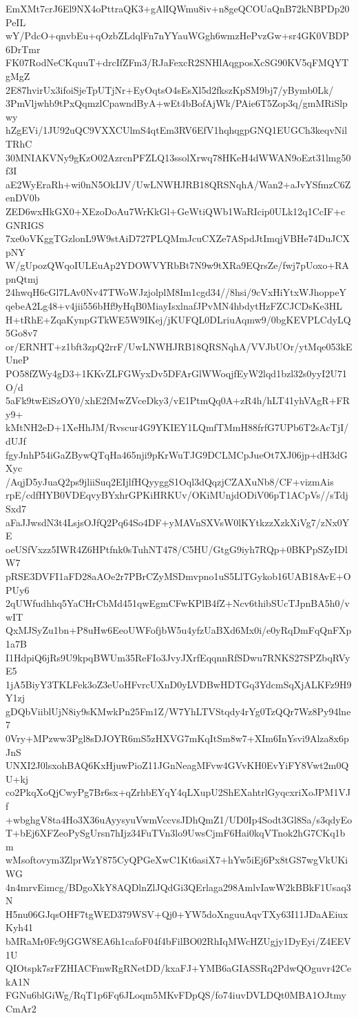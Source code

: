 EmXMt7crJ6El9NX4oPttraQK3+gAlIQWmu8iv+n8geQCOUaQnB72kNBPDp20PeIL
wY/PdcO+qnvbEu+qOzbZLdqlFn7nYYauWGgh6wmzHePvzGw+sr4GK0VBDP6DrTmr
FK07RodNeCKquuT+drcIfZFm3/RJaFexcR2SNHlAqgposXcSG90KV5qFMQYTgMgZ
2E87hvirUx3ifoiSjeTpUTjNr+EyOqtsO4sEsXl5d2fkszKpSM9bj7/yBymb0Lk/
3PmVljwhb9tPxQqmzlCpawndByA+wEt4bBofAjWk/PAie6T5Zop3q/gmMRiSlpwy
hZgEVi/1JU92uQC9VXXCUlmS4qtEm3RV6EfV1hqhqgpGNQ1EUGCh3keqvNilTRhC
30MNIAKVNy9gKzO02AzrcnPFZLQ13ssolXrwq78HKeH4dWWAN9oEzt31lmg50f3I
aE2WyEraRh+wi0nN5OkIJV/UwLNWHJRB18QRSNqhA/Wan2+aJvYSfmzC6ZenDV0b
ZED6wxHkGX0+XEzoDoAu7WrKkGl+GeWtiQWb1WaRIcip0ULk12q1CcIF+cGNRIGS
7xe0oVKggTGzlonL9W9stAiD727PLQMmJcuCXZe7ASpdJtImqjVBHe74DuJCXpNY
W/gUpozQWqoIULEuAp2YDOWVYRbBt7N9w9tXRa9EQrsZe/fwj7pUoxo+RApnQtmj
24hwqH6cGl7LAv0Nv47TWoWJzjolplM8Im1cgd34//8hsi/9cVxHiYtxWJhoppeY
qebeA2Lg48+v4jii556bHf9yHqB0MiayIsxlnafJPvMN4hbdytHzFZCJCDsKe3HL
H+tRhE+ZqaKynpGTkWE5W9IKej/jKUFQL0DLriuAqmw9/0bgKEVPLCdyLQ5Go8v7
or/ERNHT+z1bft3zpQ2rrF/UwLNWHJRB18QRSNqhA/VVJbUOr/ytMqe053kEUneP
PO58fZWy4gD3+1KKvZLFGWyxDv5DFArGlWWoqjfEyW2lqd1bzl32s0yyI2U71O/d
5aFk9twEiSzOY0/xhE2fMwZVceDky3/vE1PtmQq0A+zR4h/hLT41yhVAgR+FRy9+
kMtNH2eD+1XeHhJM/Rvscur4G9YKIEY1LQmfTMmH88frfG7UPb6T2sAcTjI/dUJf
fgyJnhP54iGaZBywQTqHa465nji9pKrWuTJG9DCLMCpJueOt7XJ06jp+dH3dGXyc
/AqjD5yJuaQ2ps9jliiSuq2EIjlfHQyyggS1Oql3dQqzjCZAXuNb8/CF+vizmAis
rpE/cdfHYB0VDEqvyBYxhrGPKiHRKUv/OKiMUnjdODiV06pT1ACpVs//sTdjSxd7
aFaJJwsdN3t4LsjsOJfQ2Pq64So4DF+yMAVnSXVsW0lKYtkzzXzkXiVg7/zNx0YE
oeUSfVxzz5IWR4Z6HPtfnk0sTuhNT478/C5HU/GtgG9iyh7RQp+0BKPpSZyIDlW7
pRSE3DVFI1aFD28aAOe2r7PBrCZyMSDmvpno1uS5LlTGykob16UAB18AvE+OPUy6
2qUWfudhhq5YaCHrCbMd451qwEgmCFwKPlB4fZ+Ncv6thibSUcTJpnBA5h0/vwIT
QxMJSyZu1bn+P8uHw6EeoUWFofjbW5u4yfzUaBXd6Mx0i/e0yRqDmFqQnFXp1a7B
I1HdpiQ6jRs9U9kpqBWUm35ReFIo3JvyJXrfEqqnnRfSDwu7RNKS27SPZbqRVyE5
1jA5BiyY3TKLFek3oZ3eUoHFvrcUXnD0yLVDBwHDTGq3YdcmSqXjALKFz9H9Y1zj
gDQbViiblUjN8iy9sKMwkPn25Fm1Z/W7YhLTVStqdy4rYg0TzQQr7Wz8Py94lne7
0Vry+MPzww3Pgl8sDJOYR6mS5zHXVG7mKqItSm8w7+XIm6InYsvi9Alza8x6pJnS
UNXI2J0lsxohBAQ6KxHjuwPioZ11JGnNeagMFvw4GVvKH0EvYiFY8Vwt2m0QU+kj
co2PkqXoQjCwyPg7Br6sx+qZrhbEYqY4qLXupU2ShEXahtrlGyqcxriXoJPM1VJf
+wbghgV8ta4Ho3X36uAyysyuVwmVccvsJDhQmZ1/UD0Ip4Sodt3Gl8Sa/s3qdyEo
T+bEj6XFZeoPySgUrsn7hIjz34FuTVn3lo9UwsCjmF6Hai0kqVTnok2hG7CKq1bm
wMsoftovym3ZlprWzY875CyQPGeXwC1Kt6asiX7+hYw5iEj6Px8tGS7wgVkUKiWG
4n4mrvEimcg/BDgoXkY8AQDlnZlJQdGi3QErlaga298AmlvIawW2kBBkF1Usaq3N
H5nu06GJqsOHF7tgWED379WSV+Qj0+YW5doXnguuAqvTXy63I11JDaAEiuxKyh41
bMRaMr0Fc9jGGW8EA6h1cafoF04f4bFilBO02RhIqMWcHZUgjy1DyEyi/Z4EEV1U
QIOtspk7srFZHIACFmwRgRNetDD/kxaFJ+YMB6aGIASSRq2PdwQOguvr42CekA1N
FGNu6blGiWg/RqT1p6Fq6JLoqm5MKvFDpQS/fo74iuvDVLDQt0MBA1OJtmyCmAr2
